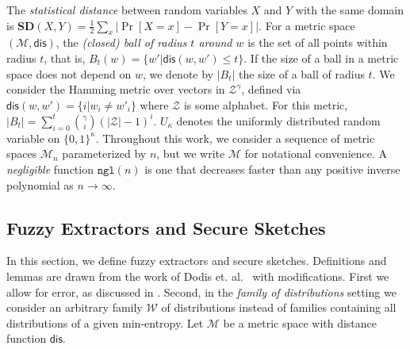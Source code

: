 \documentclass[11pt]{article}
\newcommand{\secref}[1]{\mbox{Section~\ref{#1}}}
\DeclareMathOperator*{\expe}{\mathbb{E}}
\newcommand{\dis}{\ensuremath{\mathsf{dis}}}
\newcommand{\ngl}{\ensuremath{\mathtt{ngl}}\xspace}
\newcommand{\sd}{\ensuremath{\mathbf{SD}}}
\begin{document}
The {\em statistical distance} between random variables $X$ and $Y$ with the same domain is $\sd(X,Y) = \frac12 \sum_x |\Pr[X=x] - \Pr[Y=x]|$.
For a metric space $(\mathcal{M}, \dis)$, the \emph{(closed) ball of radius $t$ around $w$} is the set of all points within radius $t$, that is, $B_t(w) = \{w'| \dis(w, w')\leq t\}$.  If the size of a ball in a metric space does not depend on $w$, we denote by $|B_t|$ the size of a ball of radius $t$.  We consider the Hamming metric over vectors in $\mathcal{Z}^\gamma$, defined via $\dis(w,w') = \{i | w_i \neq w'_i\}$ where $\mathcal{Z}$ is some alphabet.  For this metric, $|B_t| = \sum_{i=0}^t {\gamma \choose i} (|\mathcal{Z}|-1)^i $.  $U_\kappa$ denotes the uniformly  distributed random variable on $\{0,1\}^\kappa$.  Throughout this work, we consider a sequence of metric spaces $\mathcal{M}_n$ parameterized by $n$, but we write $\mathcal{M}$ for notational convenience. A \emph{negligible} function $\ngl(n)$ is one that decreases faster than any positive inverse polynomial as $n\rightarrow \infty$.

\subsection{Fuzzy Extractors and Secure Sketches}\label{sec:fuzz extractor}

In this section, we define fuzzy extractors and secure sketches.  Definitions and lemmas are drawn from the work of Dodis et. al.~\cite[Sections 2.5--4.1]{DBLP:journals/siamcomp/DodisORS08} with modifications.  First we allow for error, as discussed in \cite[Section 8]{DBLP:journals/siamcomp/DodisORS08}.  Second, in the \emph{family of distributions} setting we consider an arbitrary family $\mathcal{W}$ of distributions instead of families containing all distributions of a given min-entropy.
Let $\mathcal{M}$ be a metric space with distance function $\dis$.
\end{document}
